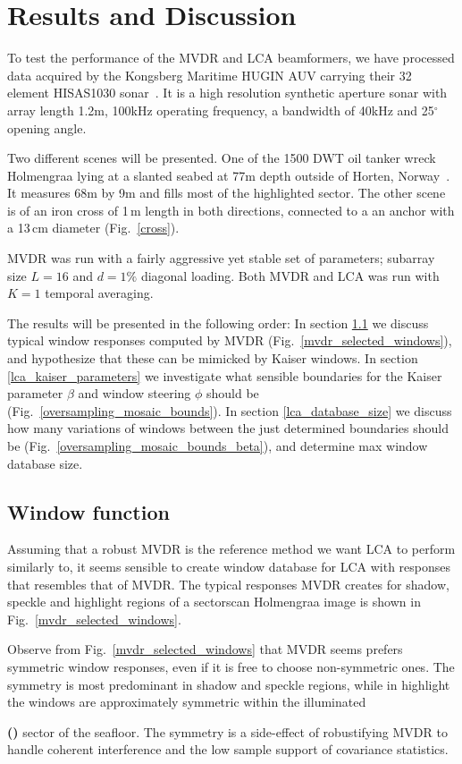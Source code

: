 \documentclass[10pt,journal,draftclsnofoot,onecolumn]{IEEEtran}
\newcounter{todoidx}
\newlength\marginparwidthsmall
\newcommand\todo[1]{%
      \addtocounter{todoidx}{1}%
      {\color{Red}\bf(\thetodoidx{})}%
      \marginpar{%
         {\vspace*{-10pt}\color{Red}\fbox{\bf\thetodoidx{}}}\\%
         \fcolorbox{red}{todobackground}{\parbox{\marginparwidthsmall}{\raggedright\scriptsize #1}}}}
\newcommand\todo[1]{}
\newcommand\Fig[1]{Fig.~\ref{#1}}
\newcommand\1{\vec 1}
\begin{document}
\section{Results and Discussion}


To test the performance of the MVDR and LCA beamformers, we have processed data acquired by the Kongsberg Maritime HUGIN AUV carrying their 32 element HISAS1030 sonar~\cite{Hansen2009}. It is a high resolution synthetic aperture sonar with array length 1.2\;m, 100\;kHz operating frequency, a bandwidth of 40\;kHz and 25$^\circ$ opening angle.

Two different scenes will be presented. One of the 1500 DWT oil tanker wreck Holmengraa lying at a slanted seabed at 77\;m depth outside of Horten, Norway~\cite{holmengraa}. It measures 68\;m by 9\;m and fills most of the highlighted sector. The other scene is of an iron cross of 1\,m length in both directions, connected to a an anchor with a 13\,cm diameter (\Fig{cross}).

MVDR was run with a fairly aggressive yet stable set of parameters; subarray size $L=16$ and $d=1\%$ diagonal loading. Both MVDR and LCA was run with $K=1$ temporal averaging.

The results will be presented in the following order: In section \ref{lca_window_function} we discuss typical window responses computed by MVDR (\Fig{mvdr_selected_windows}), and hypothesize  that these can be mimicked by Kaiser windows. In section \ref{lca_kaiser_parameters} we investigate what sensible boundaries for the Kaiser parameter $\beta$ and window steering $\phi$ should be (\Fig{oversampling_mosaic_bounds}). In section \ref{lca_database_size} we discuss how many variations of windows between the just determined boundaries should be (\Fig{oversampling_mosaic_bounds_beta}), and determine max window database size.

\subsection{Window function}\label{lca_window_function}

Assuming that a robust MVDR is the reference method we want LCA to perform similarly to, it seems sensible to create window database for LCA with responses that resembles that of MVDR. The typical responses MVDR creates for shadow, speckle and highlight regions of a sectorscan Holmengraa image is shown in \Fig{mvdr_selected_windows}.

Observe from \Fig{mvdr_selected_windows} that MVDR seems prefers symmetric window responses, even if it is free to choose non-symmetric ones. The symmetry is most predominant in shadow and speckle regions, while in highlight the windows are approximately symmetric within the illuminated\todo{valid term?} sector of the seafloor. The symmetry is a side-effect of robustifying MVDR to handle coherent interference and the low sample support of covariance statistics.
\end{document}
